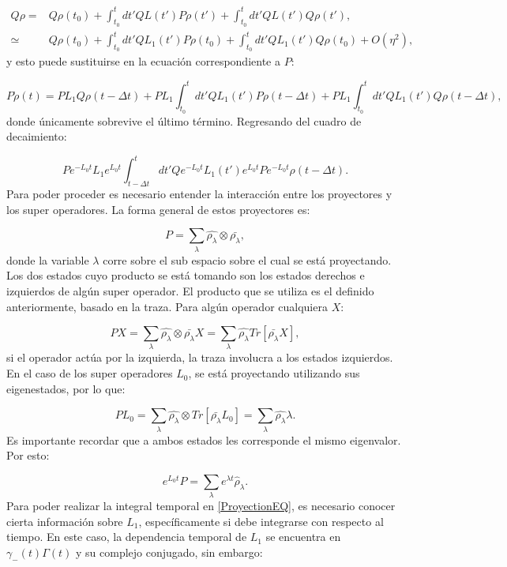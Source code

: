 \documentclass[a4paper,10pt]{report}
\begin{document}
\begin{align*}
Q\rho =& Q\rho(t_0) + \int_{t_0}^{t}dt' QL(t')P\rho(t')+\int_{t_0}^{t}dt'QL(t')Q\rho(t'),\\
\simeq & Q\rho(t_0) + \int_{t_0}^{t}dt' QL_1(t')P\rho(t_0)+\int_{t_0}^{t}dt'QL_1(t')Q\rho(t_0)+O(\eta^2),
\end{align*} y esto puede sustituirse en la ecuación correspondiente a $P$:

\begin{equation}
P\dot{\rho}(t) = PL_1Q\rho(t-\Delta t) + PL_1\int_{t_0}^{t}dt' QL_1(t')P\rho(t-\Delta t) + PL_1\int_{t_0}^{t}dt'QL_1(t')Q\rho(t-\Delta t),
\end{equation} donde únicamente sobrevive el último término. Regresando del cuadro de decaimiento:

\begin{equation}\label{ProyectionEQ}
P e^{-L_0 t}L_1e^{L_0 t}\int_{t-\Delta t}^{t}dt'Qe^{-L_0 t}L_1(t')e^{L_0 t}Pe^{-L_0 t}\rho(t-\Delta t).
\end{equation} Para poder proceder es necesario entender la interacción entre los proyectores y los super operadores. La forma general de estos proyectores es:

\begin{equation}
P = \sum_\lambda \hat{\rho_\lambda}\otimes\bar{\rho_\lambda},
\end{equation} donde la variable $\lambda$ corre sobre el sub espacio sobre el cual se está proyectando. Los dos estados cuyo producto se está tomando son los estados derechos e izquierdos de algún super operador. El producto que se utiliza es el definido anteriormente, basado en la traza. Para algún operador cualquiera $X$:

\begin{equation}
PX=\sum_\lambda \hat{\rho_\lambda}\otimes\bar{\rho_\lambda}X = \sum_\lambda \hat{\rho_\lambda}Tr[\bar{\rho_\lambda}X],
\end{equation} si el operador actúa por la izquierda, la traza involucra a los estados izquierdos. En el caso de los super operadores $L_0$, se está proyectando utilizando sus eigenestados, por lo que:

\begin{equation}
PL_0=\sum_\lambda \hat{\rho_\lambda}\otimes Tr[\bar{\rho_\lambda}L_0] = \sum_\lambda \hat{\rho_\lambda}\lambda.
\end{equation} Es importante recordar que a ambos estados les corresponde el mismo eigenvalor. Por esto:

\begin{equation}
e^{L_0 t} P = \sum_\lambda e^{\lambda t} \hat{\rho}_\lambda.
\end{equation} Para poder realizar la integral temporal en \ref{ProyectionEQ}, es necesario conocer cierta información sobre $L_1$, específicamente si debe integrarse con respecto al tiempo. En este caso, la dependencia temporal de $L_1$ se encuentra en $\gamma_-(t)\Gamma(t)$ y su complejo conjugado, sin embargo:
\end{document}
